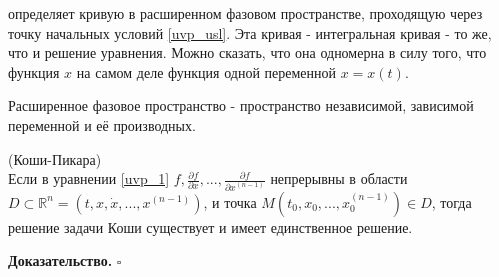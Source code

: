 определяет кривую в расширенном фазовом пространстве, проходящую через точку
начальных условий \ref{uvp_usl}. Эта кривая - интегральная кривая - то же, 
что и решение уравнения. Можно сказать, что она одномерна в силу того, что
функция $x$ на самом деле функция одной переменной  $x=x(t)$. 
\begin{defin}
Расширенное фазовое пространство - пространство независимой, зависимой 
переменной и её производных.
\end{defin}
\begin{theor}
(Коши-Пикара)\\
Если в уравнении \ref{uvp_1}  $f,\frac{\partial f}{\partial x},...,
\frac{\partial f}{\partial x^{(n-1)}}$ непрерывны в области $D\subset 
\mathbb{R}^n=(t,x,\dot x,...,x^{(n-1)})$, и точка 
$M(t_0,x_0,...,x^{(n-1)}_0)\in D$, тогда решение задачи Коши существует
и имеет единственное решение.
\end{theor}
\textbf{Доказательство.}  
$\square$ \\

